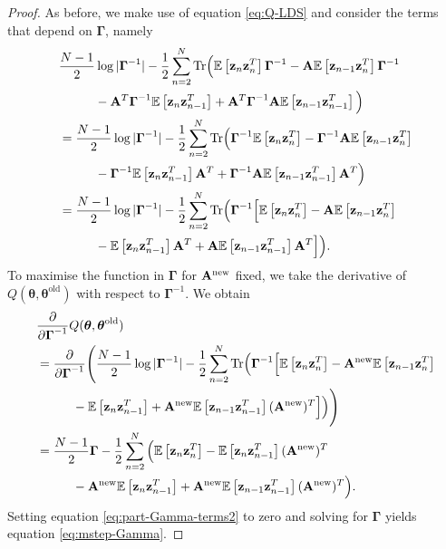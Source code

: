 \documentclass[12pt, oneside]{book}
\numberwithin{equation}{section}
\newcommand{\expectation}[1]{\mathbb{E}\left[#1\right]}
\newcommand{\z}{{\bf z}}
\begin{document}
{\begin{proof}
	As before, we make use of equation \eqref{eq:Q-LDS} and consider the terms that depend on $\boldsymbol{\Gamma}$, namely
	\begin{align}
		& \frac{N-1}{2}\log\vert\boldsymbol\Gamma^{-1}\vert -\frac{1}{2}\sum_{n=2}^N\text{Tr}\Big(\expectation{\z_n\z_n^T}\boldsymbol\Gamma^{-1} - {\bf A}\expectation{\z_{n-1}\z_n^T}\boldsymbol\Gamma^{-1} \nonumber\\
		&\hspace{1cm} - {\bf A}^T\boldsymbol{\Gamma}^{-1} \expectation{\z_n\z_{n-1}^T} + {\bf A}^T\boldsymbol\Gamma^{-1}{\bf A} \expectation{\z_{n-1}\z_{n-1}^T}\Big) \nonumber\\
		&= \frac{N-1}{2}\log\vert\boldsymbol\Gamma^{-1}\vert -\frac{1}{2}\sum_{n=2}^N\text{Tr}\Big( \boldsymbol{\Gamma}^{-1}\expectation{\z_n\z_n^T} - \boldsymbol{\Gamma}^{-1}{\bf A}\expectation{\z_{n-1}\z_n^T} \nonumber \\
		&\hspace{1cm} -\boldsymbol{\Gamma}^{-1}\expectation{\z_{n}\z_{n-1}^T}{\bf A}^T + \boldsymbol{\Gamma}^{-1} {\bf A}\expectation{\z_{n-1}\z_{n-1}^T}{\bf A}^T\Big) \nonumber\\
		&= \frac{N-1}{2}\log\vert\boldsymbol\Gamma^{-1}\vert -\frac{1}{2}\sum_{n=2}^N\text{Tr}\Big(\boldsymbol{\Gamma}^{-1}\Big[\expectation{\z_n\z_n^T} - {\bf A}\expectation{\z_{n-1}\z_n^T} \nonumber \\
		&\hspace{1cm} -\expectation{\z_n\z_{n-1}^T}{\bf A}^T + {\bf A}\expectation{\z_{n-1}\z_{n-1}^T}{\bf A}^T \Big]\Big) \label{eq:part-Gamma-terms1}.
	\end{align}
	To maximise the function in $\boldsymbol \Gamma$ for ${\bf A}^\text{new}$ fixed,  we take the derivative of $Q(\boldsymbol\theta, \boldsymbol\theta^\text{old})$ with respect to $\boldsymbol{\Gamma}^{-1}$. We obtain
	\begin{align}
		&\frac{\partial}{\partial \boldsymbol{\Gamma}^{-1}}Q(\boldsymbol\theta, \boldsymbol\theta^{\text{old}}) \\
		&= \frac{\partial}{\partial \boldsymbol{\Gamma}^{-1}}\Bigg(\frac{N-1}{2}\log\vert\boldsymbol\Gamma^{-1}\vert -\frac{1}{2}\sum_{n=2}^N\text{Tr}\Big(\boldsymbol{\Gamma}^{-1}\Big[\expectation{\z_n\z_n^T} - {\bf A}^{\text{new}}\expectation{\z_{n-1}\z_n^T} \nonumber \\
		&\hspace{1cm} -\expectation{\z_n\z_{n-1}^T} + {\bf A}^{\text{new}}\expectation{\z_{n-1}\z_{n-1}^T}({\bf A}^{\text{new}})^T \Big]\Big)\Bigg) \\
		&= \frac{N-1}{2}\boldsymbol\Gamma -\frac{1}{2}\sum_{n=2}^N\Big(\expectation{\z_n\z_n^T} - \expectation{\z_n\z_{n-1}^T}({\bf A}^{\text{new}})^T  \nonumber \\
		& \hspace{1cm} - {\bf A}^{\text{new}}\expectation{\z_n\z_{n-1}^T} + {\bf A}^{\text{new}}\expectation{\z_{n-1}\z_{n-1}^T}({\bf A}^{\text{new}})^T\Big). \label{eq:part-Gamma-terms2}
	\end{align}	
	Setting equation \eqref{eq:part-Gamma-terms2} to zero and solving for $\boldsymbol{\Gamma}$ yields equation \eqref{eq:mstep-Gamma}.
\end{proof}

}
\end{document}

